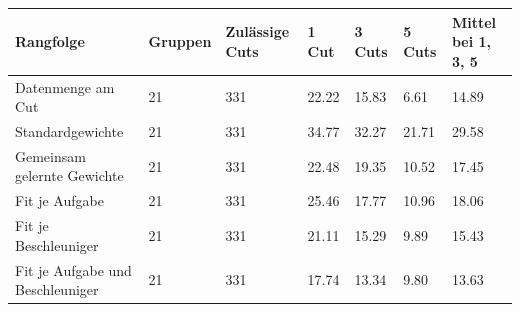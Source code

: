 \begin{tabular}{@{}lllllll@{}}
\toprule
Rangfolge & Gruppen & Zulässige Cuts & 1 Cut & 3 Cuts & 5 Cuts & Mittel bei 1, 3, 5 \\
\midrule
Datenmenge am Cut & 21 & 331 & 22.22 & 15.83 & 6.61 & 14.89 \\
Standardgewichte & 21 & 331 & 34.77 & 32.27 & 21.71 & 29.58 \\
Gemeinsam gelernte Gewichte & 21 & 331 & 22.48 & 19.35 & 10.52 & 17.45 \\
Fit je Aufgabe & 21 & 331 & 25.46 & 17.77 & 10.96 & 18.06 \\
Fit je Beschleuniger & 21 & 331 & 21.11 & 15.29 & 9.89 & 15.43 \\
Fit je Aufgabe und Beschleuniger & 21 & 331 & 17.74 & 13.34 & 9.80 & 13.63 \\
\bottomrule
\end{tabular}
